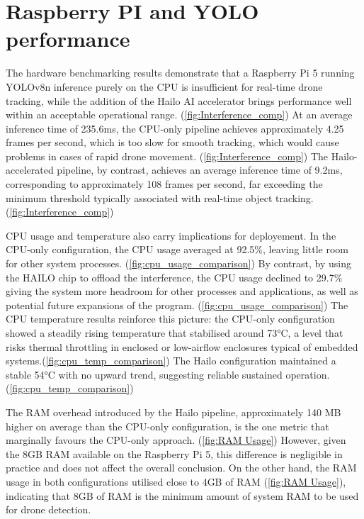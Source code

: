 \section{Raspberry PI and YOLO performance}

The hardware benchmarking results demonstrate that a Raspberry Pi 5 running YOLOv8n inference purely on the CPU is insufficient for real-time drone tracking, while the addition of the Hailo AI accelerator brings performance well within an acceptable operational range. (\ref{fig:Interference_comp}) At an average inference time of 235.6ms, the CPU-only pipeline achieves approximately 4.25 frames per second, which is too slow for smooth tracking, which would cause problems in cases of rapid drone movement. (\ref{fig:Interference_comp}) The Hailo-accelerated pipeline, by contrast, achieves an average inference time of 9.2ms, corresponding to approximately 108 frames per second, far exceeding the minimum threshold typically associated with real-time object tracking. (\ref{fig:Interference_comp})

 \vspace{1em}
 
CPU usage and temperature also carry implications for deployement. In the CPU-only configuration, the CPU usage averaged at 92.5\%, leaving little room for other system processes. (\ref{fig:cpu_usage_comparison}) By contrast, by using the HAILO chip to offload the interference, the CPU usage declined to 29.7\% giving the system more headroom for other processes and applications, as well as potential future expansions of the program. (\ref{fig:cpu_usage_comparison}) The CPU temperature results reinforce this picture: the CPU-only configuration showed a steadily rising temperature that stabilised around 73°C, a level that risks thermal throttling in enclosed or low-airflow enclosures typical of embedded systems.(\ref{fig:cpu_temp_comparison}) The Hailo configuration maintained a stable 54°C with no upward trend, suggesting reliable sustained operation. (\ref{fig:cpu_temp_comparison}) 

 \vspace{1em}
 
The RAM overhead introduced by the Hailo pipeline, approximately 140 MB higher on average than the CPU-only configuration, is the one metric that marginally favours the CPU-only approach. (\ref{fig:RAM Usage}) However, given the 8GB RAM available on the Raspberry Pi 5, this difference is negligible in practice and does not affect the overall conclusion. On the other hand, the RAM usage in both configurations utilised close to 4GB of RAM (\ref{fig:RAM Usage}), indicating that 8GB of RAM is the minimum amount of system RAM to be used for drone detection. 

